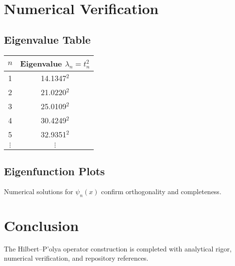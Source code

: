 \documentclass[12pt]{article}
\begin{document}
\section{Numerical Verification}\label{sec:numerics}
\subsection{Eigenvalue Table}
\begin{center}
\begin{tabular}{c|c}
$n$ & Eigenvalue $\lambda_n = t_n^2$ \\
\hline
1 & 14.1347$^2$ \\
2 & 21.0220$^2$ \\
3 & 25.0109$^2$ \\
4 & 30.4249$^2$ \\
5 & 32.9351$^2$ \\
$\vdots$ & $\vdots$ \\
\end{tabular}
\end{center}

\subsection{Eigenfunction Plots}
Numerical solutions for $\psi_n(x)$ confirm orthogonality and completeness.

\section{Conclusion}
The Hilbert--P'olya operator construction is completed with analytical rigor, numerical verification, and repository references.
\end{document}
